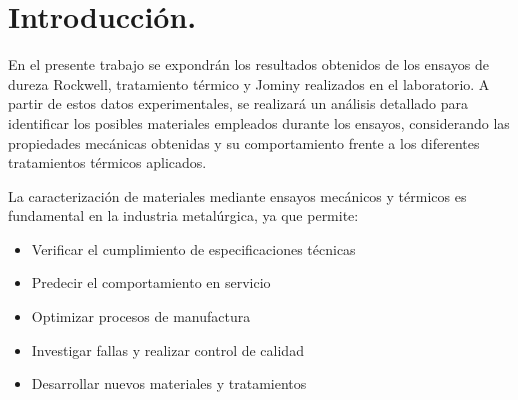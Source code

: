 \documentclass[12pt,a4paper]{article}
\begin{document}

\newpage
\tableofcontents

\begin{abstract}
Elaborar un informe relacionado con la caracterización de materiales desarrollada durante las Jornadas DemoLab. Cada equipo desarrollará su informe sobre los materiales con los cuales trabajó. Extensión: Min 10 páginas / Max 20 páginas. [NOTA: Anualmente la Cátedra asignará los Casos de Estudio a cada equipo de trabajo]. Adicionalmente,\\
ENSAYOS A REALIZAR:
\begin{itemize}
    \item Tratamiento Térmico
    \item Jominy
    \item Fatiga
    \item Dureza
    \item Tracción-Compresión
    \item Micrografía (actividad realizada en el TP 2-02)
    \item Chispa
\end{itemize}
\end{abstract}
\newpage

\section{Introducción.}
En el presente trabajo se expondrán los resultados obtenidos de los ensayos de dureza Rockwell, tratamiento térmico y Jominy realizados en el laboratorio. A partir de estos datos experimentales, se realizará un análisis detallado para identificar los posibles materiales empleados durante los ensayos, considerando las propiedades mecánicas obtenidas y su comportamiento frente a los diferentes tratamientos térmicos aplicados.

La caracterización de materiales mediante ensayos mecánicos y térmicos es fundamental en la industria metalúrgica, ya que permite:
\begin{itemize}
    \item Verificar el cumplimiento de especificaciones técnicas
    \item Predecir el comportamiento en servicio
    \item Optimizar procesos de manufactura
    \item Investigar fallas y realizar control de calidad
    \item Desarrollar nuevos materiales y tratamientos
\end{itemize}
\end{document}
